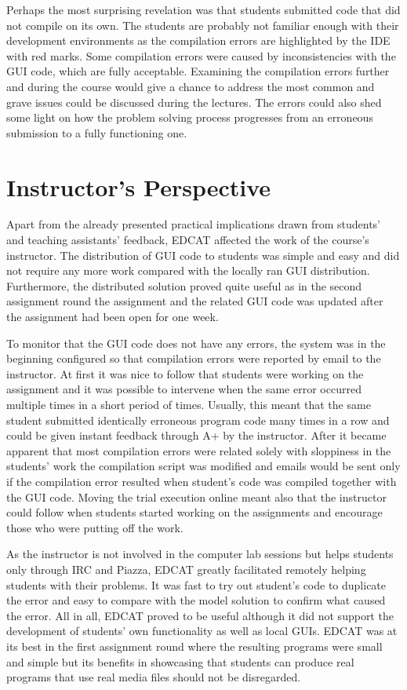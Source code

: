 Perhaps the most surprising revelation was that students submitted code that did not compile on its own. The students are probably not familiar enough with their development environments as the compilation errors are highlighted by the IDE with red marks. Some compilation errors were caused by inconsistencies with the GUI code, which are fully acceptable. Examining the compilation errors further and during the course would give a chance to address the most common and grave issues could be discussed during the lectures. The errors could also shed some light on how the problem solving process progresses from an erroneous submission to a fully functioning one.


\section{Instructor's Perspective}
\label{section:instructor}

Apart from the already presented practical implications drawn from students' and teaching assistants' feedback, EDCAT affected the work of the course's instructor. The distribution of GUI code to students was simple and easy and did not require any more work compared with the locally ran GUI distribution. Furthermore, the distributed solution proved quite useful as in the second assignment round the assignment and the related GUI code was updated after the assignment had been open for one week.

To monitor that the GUI code does not have any errors, the system was in the beginning configured so that compilation errors were reported by email to the instructor. At first it was nice to follow that students were working on the assignment and it was possible to intervene when the same error occurred multiple times in a short period of times. Usually, this meant that the same student submitted identically erroneous program code many times in a row and could be given instant feedback through A+ by the instructor. After it became apparent that most compilation errors were related solely with sloppiness in the students' work the compilation script was modified and emails would be sent only if the compilation error resulted when student's code was compiled together with the GUI code. Moving the trial execution online meant also that the instructor could follow when students started working on the assignments and encourage those who were putting off the work.

As the instructor is not involved in the computer lab sessions but helps students only through IRC and Piazza, EDCAT greatly facilitated remotely helping students with their problems. It was fast to try out student's code to duplicate the error and easy to compare with the model solution to confirm what caused the error. All in all, EDCAT proved to be useful although it did not support the development of students' own functionality as well as local GUIs. EDCAT was at its best in the first assignment round where the resulting programs were small and simple but its benefits in showcasing that students can produce real programs that use real media files should not be disregarded.


